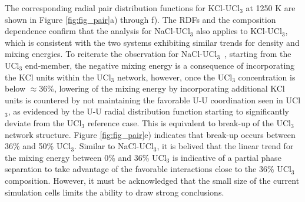 \documentclass[preprint,3p,10pt,twocolumn,number,sort&compress]{elsarticle}
\begin{document}
The corresponding radial pair distribution functions for KCl-UCl$_3$ at 1250 K are shown in Figure \ref{fig:fig_pair}a) through f). The RDFs and the composition dependence confirm that the analysis for NaCl-UCl$_3$ also applies to KCl-UCl$_3$, which is consistent with the two systems exhibiting similar trends for density and mixing energies. To reiterate the observation for NaCl-UCl$_3$~\cite{Andersson}, starting from the UCl$_3$ end-member, the negative mixing energy is a consequence of incorporating the KCl units within the UCl$_3$ network, however, once the UCl$_3$ concentration is below $\approx36\%$, lowering of the mixing energy by incorporating additional KCl units is countered by not maintaining the favorable U-U coordination seen in UCl$_3$, as evidenced by the U-U radial distribution function starting to significantly deviate from the UCl$_3$ reference case. This is equivalent to break-up of the UCl$_3$ network structure. Figure \ref{fig:fig_pair}e) indicates that break-up occurs between 36\% and 50\% UCl$_3$. Similar to NaCl-UCl$_3$, it is belived that the linear trend for the mixing energy between 0\% and 36\% UCl$_3$ is indicative of a partial phase separation to take advantage of the favorable interactions close to the 36\% UCl$_3$ composition. However, it must be acknowledged that the small size of the current simulation cells limits the ability to draw strong conclusions. 
\end{document}
